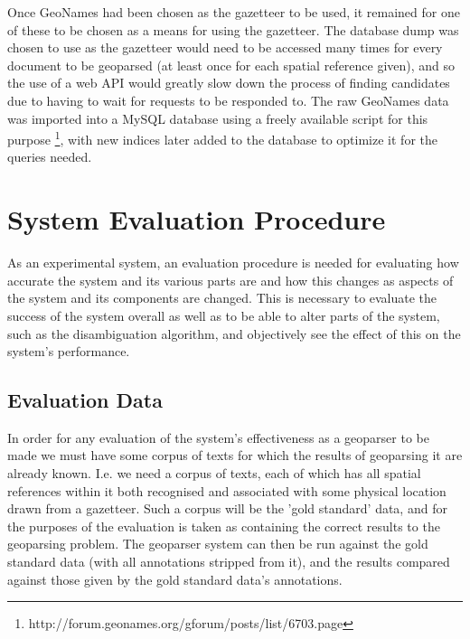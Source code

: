 \documentclass[12pt, a4paper]{report}
\begin{document}
Once GeoNames had been chosen as the gazetteer to be used, it remained for one of these to be chosen as a means for using the gazetteer. The database dump was chosen to use as the gazetteer would need to be accessed many times for every document to be geoparsed (at least once for each spatial reference given), and so the use of a web API would greatly slow down the process of finding candidates due to having to wait for requests to be responded to. The raw GeoNames data was imported into a MySQL database using a freely available script for this purpose \footnote{http://forum.geonames.org/gforum/posts/list/6703.page}, with new indices later added to the database to optimize it for the queries needed.



\section{System Evaluation Procedure}
\label{evaluation_procedure}


As an experimental system, an evaluation procedure is needed for evaluating how accurate the system and its various parts are and how this changes as aspects of the system and its components are changed. This is necessary to evaluate the success of the system overall as well as to be able to alter parts of the system, such as the disambiguation algorithm, and objectively see the effect of this on the system's performance.


\subsection{Evaluation Data}

In order for any evaluation of the system's effectiveness as a geoparser to be made we must have some corpus of texts for which the results of geoparsing it are already known. I.e. we need a corpus of texts, each of which has all spatial references within it both recognised and associated with some physical location drawn from a gazetteer. Such a corpus will be the 'gold standard' data, and for the purposes of the evaluation is taken as containing the correct results to the geoparsing problem. The geoparser system can then be run against the gold standard data (with all annotations stripped from it), and the results compared against those given by the gold standard data's annotations.
\end{document}
